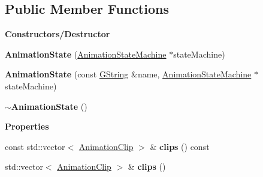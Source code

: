 \subsection*{Public Member Functions}
\begin{Indent}\textbf{ Constructors/\+Destructor}\par
\begin{DoxyCompactItemize}
\item 
\mbox{\label{classrev_1_1_animation_state_ae4f7f7efb0064a17766cc19648f9007c}} 
{\bfseries Animation\+State} (\mbox{\hyperlink{classrev_1_1_animation_state_machine}{Animation\+State\+Machine}} $\ast$state\+Machine)
\item 
\mbox{\label{classrev_1_1_animation_state_a371298b79c5177eff453ab611627f6bc}} 
{\bfseries Animation\+State} (const \mbox{\hyperlink{classrev_1_1_g_string}{G\+String}} \&name, \mbox{\hyperlink{classrev_1_1_animation_state_machine}{Animation\+State\+Machine}} $\ast$state\+Machine)
\item 
\mbox{\label{classrev_1_1_animation_state_aef79ced34e28e828ffb86c696fee3478}} 
{\bfseries $\sim$\+Animation\+State} ()
\end{DoxyCompactItemize}
\end{Indent}
\begin{Indent}\textbf{ Properties}\par
\begin{DoxyCompactItemize}
\item 
\mbox{\label{classrev_1_1_animation_state_af22deea416df8b753322cfdd48f0335e}} 
const std\+::vector$<$ \mbox{\hyperlink{classrev_1_1_animation_clip}{Animation\+Clip}} $>$ \& {\bfseries clips} () const
\item 
\mbox{\label{classrev_1_1_animation_state_a2cd8ab6f9d80bbf198f60b0991c1d5b3}} 
std\+::vector$<$ \mbox{\hyperlink{classrev_1_1_animation_clip}{Animation\+Clip}} $>$ \& {\bfseries clips} ()
\end{DoxyCompactItemize}
\end{Indent}
